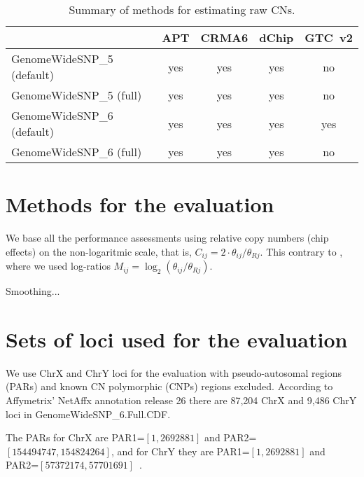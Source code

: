 \documentclass[10pt,a4paper]{article}
\newcommand{\GWSFive}{GWS5\xspace}
\newcommand{\GWSSix}{GWS6\xspace}
\newcommand{\GWSSixf}{GenomeWideSNP\_6\xspace}
\newcommand{\citet}[1]{\cite{#1}}
\begin{document}

\begin{table}[htp]
\begin{center}
\begin{tabular}{lcccc}
                             &  APT      & CRMA6     & dChip     & GTC~v2  \\
\hline
GenomeWideSNP\_5 (default)   &  yes      & yes       & yes       & no      \\
GenomeWideSNP\_5 (full)      &  yes      & yes       & yes       & no      \\
GenomeWideSNP\_6 (default)   &  yes      & yes       & yes       & yes     \\
GenomeWideSNP\_6 (full)      &  yes      & yes       & yes       & no      \\
\hline
\end{tabular}
\end{center}
\caption{Summary of methods for estimating raw CNs.}
\label{tblSummaryOfMethods}
\end{table}



\section{Methods for the evaluation}
We base all the performance assessments using relative copy numbers (chip effects) on the non-logaritmic scale, that is, $C_{ij}=2\cdot\theta_{ij}/\theta_{Rj}$.  This contrary to \cite{BengtssonH_etal_2008a}, where we used log-ratios $M_{ij}=\log_2(\theta_{ij}/\theta_{Rj})$.  

Smoothing...


\section{Sets of loci used for the evaluation}

We use ChrX and ChrY loci for the evaluation with pseudo-autosomal regions (PARs) and known CN polymorphic (CNPs) regions excluded.  
According to Affymetrix' NetAffx annotation release 26 there are 87,204 ChrX and 9,486 ChrY loci in \GWSSixf.Full.CDF.

The PARs for ChrX are PAR1=$[1,2692881]$ and PAR2=$[154494747,154824264]$, and for ChrY they are PAR1=$[1,2692881]$ and PAR2=$[57372174,57701691]$~\citet{BlaschkeRappold_2006}.
\end{document}
